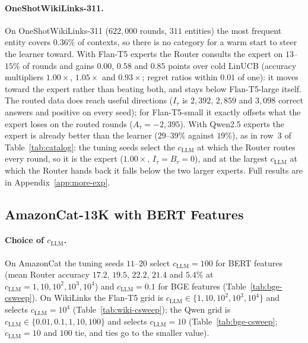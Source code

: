 \documentclass[anon]{alt2027} %
\begin{document}
\paragraph{OneShotWikiLinks-311.} On OneShotWikiLinks-311 ($622{,}000$ rounds, $311$ entities) the most
frequent entity covers $0.36\%$ of contexts, so there is no category for a
warm start to steer the learner toward. With Flan-T5 experts the Router
consults the expert on $13$--$15\%$ of rounds and gains $0.00$, $0.58$ and
$0.85$ points over cold LinUCB (accuracy multipliers $1.00\times$,
$1.05\times$ and $0.93\times$; regret ratios within $0.01$ of one): it moves
toward the expert rather than beating both, and stays below Flan-T5-large
itself. The routed data does reach useful directions ($I_\tau$ is $2{,}392$,
$2{,}859$ and $3{,}098$ correct answers and positive on every seed); for
Flan-T5-small it exactly offsets what the expert loses on the routed rounds
($A_\tau=-2{,}395$). With Qwen2.5 experts the expert is already better than
the learner ($29$--$39\%$ against $19\%$), as in row~3 of
Table~\ref{tab:catalog}: the tuning seeds select the $c_{\mathrm{LLM}}$ at which the
Router routes every round, so it is the expert ($1.00\times$,
$I_\tau=B_\tau=0$), and at the largest $c_{\mathrm{LLM}}$ at which the Router hands
back it falls below the two larger experts. Full results are in
Appendix~\ref{app:more-exp}.


\subsection{AmazonCat-13K with BERT Features}
\label{app:amazon-bert}

\paragraph{Choice of $c_{\mathrm{LLM}}$.} On AmazonCat the tuning seeds $11$--$20$ select
$c_{\mathrm{LLM}}=100$ for BERT features (mean Router accuracy $17.2$, $19.5$, $22.2$, $21.4$
and $5.4\%$ at $c_{\mathrm{LLM}}=1,10,10^2,10^3,10^4$) and $c_{\mathrm{LLM}}=0.1$ for BGE features
(Table~\ref{tab:bge-csweep}). On WikiLinks the Flan-T5 grid is
$c_{\mathrm{LLM}}\in\{1,10,10^2,10^3,10^4\}$ and selects $c_{\mathrm{LLM}}=10^4$
(Table~\ref{tab:wiki-csweep}); the Qwen grid is
$c_{\mathrm{LLM}}\in\{0.01,0.1,1,10,100\}$ and selects $c_{\mathrm{LLM}}=10$
(Table~\ref{tab:bge-csweep}; $c_{\mathrm{LLM}}=10$ and $100$ tie, and ties go to the
smaller value).
\end{document}
